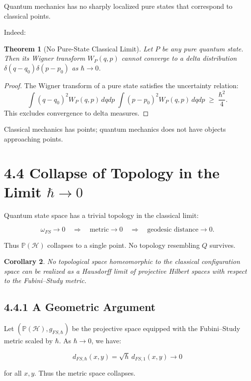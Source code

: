 \documentclass[12pt,oneside]{book}
\theoremstyle{plain}
\newtheorem{theorem}{Theorem}[chapter]
\newtheorem{corollary}[theorem]{Corollary}
\theoremstyle{definition}
\begin{document}
Quantum mechanics has no sharply localized pure states that correspond to classical points.

Indeed:

\begin{theorem}[No Pure-State Classical Limit]
Let $P$ be any pure quantum state.  
Then its Wigner transform $W_P(q,p)$ cannot converge to a delta distribution $\delta(q-q_0)\delta(p-p_0)$ as $\hbar\to0$.
\end{theorem}

\begin{proof}
The Wigner transform of a pure state satisfies the uncertainty relation:
\[
\int (q-q_0)^2 W_P(q,p)\,dqdp \;
\int (p-p_0)^2 W_P(q,p)\,dqdp
\;\ge\; \frac{\hbar^2}{4}.
\]
This excludes convergence to delta measures.
\end{proof}

Classical mechanics has points; quantum mechanics does not have objects approaching points.

\section{4.4 Collapse of Topology in the Limit $\hbar\to 0$}

Quantum state space has a trivial topology in the classical limit:

\[
\omega_{FS}\to0 
\quad\Rightarrow\quad
\text{metric} \to 0
\quad\Rightarrow\quad
\text{geodesic distance} \to 0.
\]

Thus $\mathbb{P}(\mathcal{H})$ collapses to a single point.  
No topology resembling $Q$ survives.

\begin{corollary}
No topological space homeomorphic to the classical configuration space can be realized as a Hausdorff limit of projective Hilbert spaces with respect to the Fubini–Study metric.
\end{corollary}

\subsection{4.4.1 A Geometric Argument}

Let $(\mathbb{P}(\mathcal{H}),g_{FS,\hbar})$ be the projective space equipped with the Fubini–Study metric scaled by $\hbar$.  
As $\hbar\to0$, we have:

\[
d_{FS,\hbar}(x,y) = \sqrt{\hbar}\, d_{FS,1}(x,y) \to 0
\]

for all $x,y$.  
Thus the metric space collapses.
\end{document}
